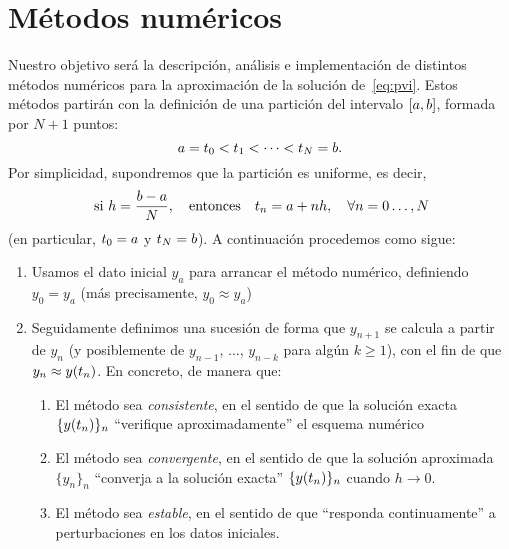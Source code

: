 \section{Métodos numéricos}

Nuestro objetivo será la descripción, análisis e implementación de
distintos métodos numéricos para la aproximación de la solución
de~\eqref{eq:pvi}. Estos métodos partirán con la definición de una
partición del intervalo $[\ta,\tb]$, formada por $N+1$ puntos:
\begin{equation*}
  \ta=\tt_0 < \tt_1 < \cdots < \tt_N=\tb.
\end{equation*}
Por simplicidad, supondremos que la partición es uniforme, es decir,
\begin{equation*}
  \text{ si } h=\frac{b-a}{N}, \quad \text{entonces} \quad
  \tt_n=\ta+nh,\quad \forall n=0\dots,N
\end{equation*}
(en particular, $\tt_0=a$ y $\tt_N=b$). A continuación procedemos como
sigue:
\begin{enumerate}
\item Usamos el dato inicial $y_a$ para arrancar el método numérico,
  definiendo $y_0=y_a$ (más precisamente, $y_0\approx y_a$)
\item Seguidamente definimos una sucesión de forma que $y_{n+1}$ se
  calcula a partir de $y_n$ (y posiblemente de $y_{n-1}$, ...,
  $y_{n-k}$ para algún $k\ge 1$), con el fin de que
  $y_n\approx\sol(\tt_n)$. En concreto, de manera que:
  \begin{enumerate}
  \item El método sea \textit{consistente}, en el sentido de que la
    solución exacta $\{\sol(\tt_n)\}_n$ ``verifique aproximadamente'' el
    esquema numérico
  \item El método sea \textit{convergente}, en el sentido de que la
    solución aproximada $\{y_n\}_n$ ``converja a la solución exacta''
    $\{\sol(\tt_n)\}_n$ cuando $h\to 0$.
  \item El método sea \textit{estable}, en el sentido de que ``responda
    continuamente'' a perturbaciones en los datos iniciales.
  \end{enumerate}
\end{enumerate}


